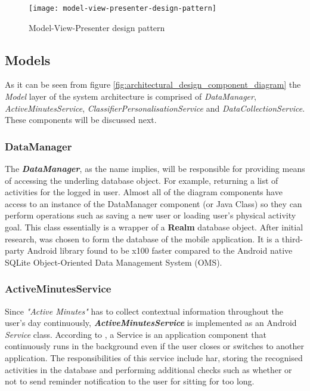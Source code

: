     \begin{figure}[ht]
        \centering
        \texttt{[image: model-view-presenter-design-pattern]}
        \caption{Model-View-Presenter design pattern \citep[28]{syromiatnikov2014}}
        \label{fig:model_view_presenter_design_pattern}
    \end{figure}
        
        \subsection{Models}
        As it can be seen from figure \ref{fig:architectural_design_component_diagram} the \textit{Model} layer of the system architecture is comprised of \textit{DataManager}, \textit{ActiveMinutesService}, \textit{ClassifierPersonalisationService} and \textit{DataCollectionService}. These components will be discussed next.
        
            \subsubsection{DataManager}
            \label{section:data-manager}
            The \textbf{\textit{DataManager}}, as the name implies, will be responsible for providing means of accessing the underling database object. For example, returning a list of activities for the logged in user. Almost all of the diagram components have access to an instance of the DataManager component (or Java Class) so they can perform operations such as saving a new user or loading user's physical activity goal. This class essentially is a wrapper of a \textbf{Realm} database object. After initial research, \citet{realm2014} was chosen to form the database of the mobile application. It is a third-party Android library found to be x100 faster compared to the Android native SQLite Object-Oriented Data Management System (OMS).
            
            \subsubsection{ActiveMinutesService}
            Since \textit{"Active Minutes"} has to collect contextual information throughout the user's day continuously, \textbf{\textit{ActiveMinutesService}} is implemented as an Android \textit{Service} class. According to \citet{googleservices2017}, a Service is an application component that continuously runs in the background even if the user closes or switches to another application. The responsibilities of this service include \gls{har}, storing the recognised activities in the database and performing additional checks such as whether or not to send reminder notification to the user for sitting for too long.
            
